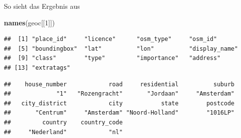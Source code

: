 \documentclass[ignorenonframetext,]{beamer}
\newenvironment{Shaded}{\begin{snugshade}}{\end{snugshade}}
\newcommand{\DecValTok}[1]{\textcolor[rgb]{0.27,0.67,0.26}{#1}}
\newcommand{\KeywordTok}[1]{\textcolor[rgb]{0.26,0.66,0.93}{\textbf{#1}}}
\newcommand{\NormalTok}[1]{\textcolor[rgb]{0.74,0.68,0.62}{#1}}
\newcommand{\OperatorTok}[1]{\textcolor[rgb]{0.74,0.68,0.62}{#1}}
\begin{document}
\begin{frame}[fragile]{So sieht das Ergebnis aus}
\protect\hypertarget{so-sieht-das-ergebnis-aus}{}

\begin{Shaded}
\begin{Highlighting}[]
\KeywordTok{names}\NormalTok{(geoc[[}\DecValTok{1}\NormalTok{]])}
\end{Highlighting}
\end{Shaded}

\begin{verbatim}
##  [1] "place_id"     "licence"      "osm_type"     "osm_id"      
##  [5] "boundingbox"  "lat"          "lon"          "display_name"
##  [9] "class"        "type"         "importance"   "address"     
## [13] "extratags"
\end{verbatim}

\begin{Shaded}
\end{Shaded}

\begin{verbatim}
##    house_number            road     residential          suburb 
##             "1"   "Rozengracht"       "Jordaan"     "Amsterdam" 
##   city_district            city           state        postcode 
##       "Centrum"     "Amsterdam" "Noord-Holland"        "1016LP" 
##         country    country_code 
##     "Nederland"            "nl"
\end{verbatim}

\end{frame}
\end{document}
